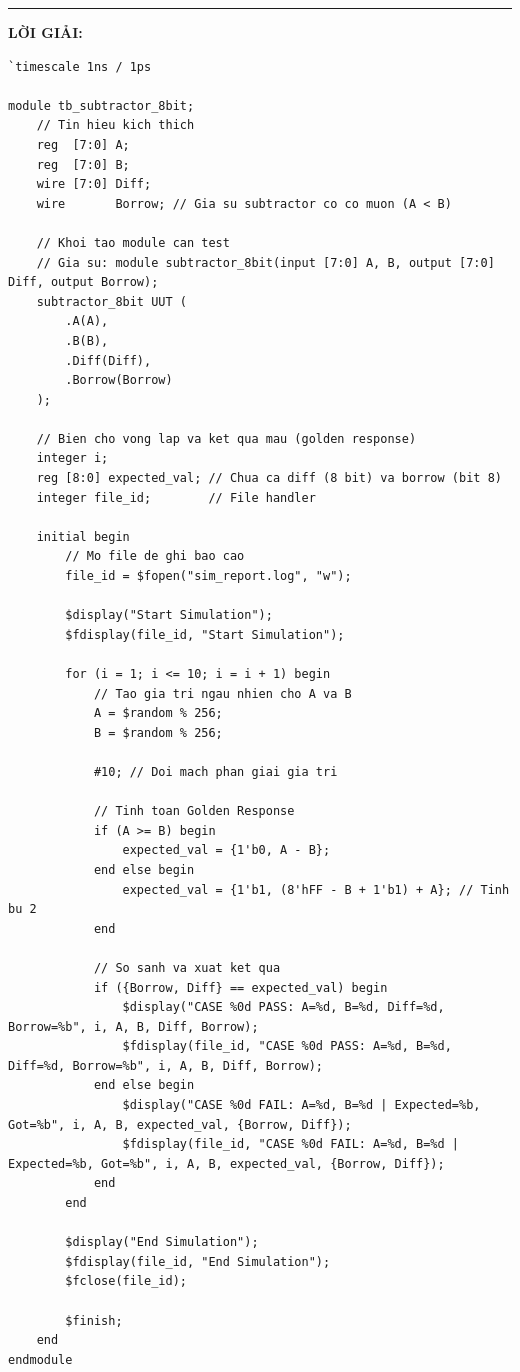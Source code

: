 \documentclass[12pt,a4paper]{article}
\begin{document}
\hrule\vspace{0.5cm}
\textbf{LỜI GIẢI:}

\begin{lstlisting}[style=verilogstyle]
`timescale 1ns / 1ps

module tb_subtractor_8bit;
    // Tin hieu kich thich
    reg  [7:0] A;
    reg  [7:0] B;
    wire [7:0] Diff;
    wire       Borrow; // Gia su subtractor co co muon (A < B)

    // Khoi tao module can test
    // Gia su: module subtractor_8bit(input [7:0] A, B, output [7:0] Diff, output Borrow);
    subtractor_8bit UUT (
        .A(A),
        .B(B),
        .Diff(Diff),
        .Borrow(Borrow)
    );

    // Bien cho vong lap va ket qua mau (golden response)
    integer i;
    reg [8:0] expected_val; // Chua ca diff (8 bit) va borrow (bit 8)
    integer file_id;        // File handler

    initial begin
        // Mo file de ghi bao cao
        file_id = $fopen("sim_report.log", "w");
        
        $display("Start Simulation");
        $fdisplay(file_id, "Start Simulation");

        for (i = 1; i <= 10; i = i + 1) begin
            // Tao gia tri ngau nhien cho A va B
            A = $random % 256;
            B = $random % 256;
            
            #10; // Doi mach phan giai gia tri
            
            // Tinh toan Golden Response
            if (A >= B) begin
                expected_val = {1'b0, A - B};
            end else begin
                expected_val = {1'b1, (8'hFF - B + 1'b1) + A}; // Tinh bu 2
            end
            
            // So sanh va xuat ket qua
            if ({Borrow, Diff} == expected_val) begin
                $display("CASE %0d PASS: A=%d, B=%d, Diff=%d, Borrow=%b", i, A, B, Diff, Borrow);
                $fdisplay(file_id, "CASE %0d PASS: A=%d, B=%d, Diff=%d, Borrow=%b", i, A, B, Diff, Borrow);
            end else begin
                $display("CASE %0d FAIL: A=%d, B=%d | Expected=%b, Got=%b", i, A, B, expected_val, {Borrow, Diff});
                $fdisplay(file_id, "CASE %0d FAIL: A=%d, B=%d | Expected=%b, Got=%b", i, A, B, expected_val, {Borrow, Diff});
            end
        end

        $display("End Simulation");
        $fdisplay(file_id, "End Simulation");
        $fclose(file_id);
        
        $finish;
    end
endmodule
\end{lstlisting}
\end{document}
